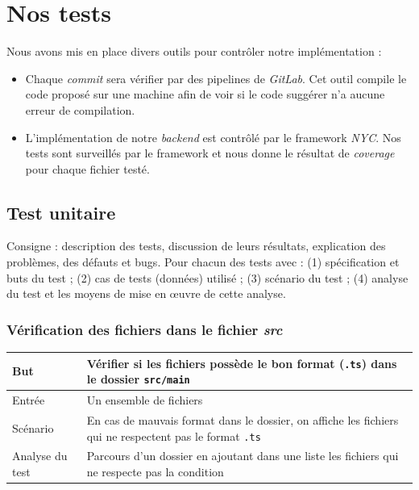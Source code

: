 \section{Nos tests}

Nous avons mis en place divers outils pour contrôler notre implémentation :
\begin{itemize}
    \item Chaque \emph{commit} sera vérifier par des pipelines de \emph{GitLab}. Cet outil compile le code proposé sur une machine afin de voir si le code suggérer n'a aucune erreur de compilation.
    \item L'implémentation de notre \emph{backend} est contrôlé par le framework \emph{NYC}. Nos tests sont surveillés par le framework et nous donne le résultat de \emph{coverage} pour chaque fichier testé.
\end{itemize}

\subsection{Test unitaire}

Consigne : description des tests, discussion de leurs résultats, explication des problèmes, des défauts et bugs. Pour chacun des tests avec : (1) spécification et buts du test ;
(2) cas de tests (données) utilisé ; (3) scénario du test ; (4) analyse du test et les moyens de mise en œuvre de cette analyse.

\subsubsection{Vérification des fichiers dans le fichier \emph{src}}

\begin{center}
    \centering
    \begin{tabular}[h]{|m{4cm}|m{12cm}|} 
        \hline
        \rowcolor[HTML]{F8B400}
        \textbf{But} & Vérifier si les fichiers possède le bon format (\texttt{.ts}) dans le dossier \texttt{src/main} \\
        \hline
        \hline
        \rowcolor[HTML]{F7F7F7}
        Entrée & Un ensemble de fichiers \\
        \hline
        \rowcolor[HTML]{F7F7F7}
        Scénario & En cas de mauvais format dans le dossier, on affiche les fichiers qui ne respectent pas le format \texttt{.ts}\\
        \hline
        \rowcolor[HTML]{F7F7F7}
        Analyse du test & Parcours d'un dossier en ajoutant dans une liste les fichiers qui ne respecte pas la condition \\
        \hline
    \end{tabular}
\end{center}


